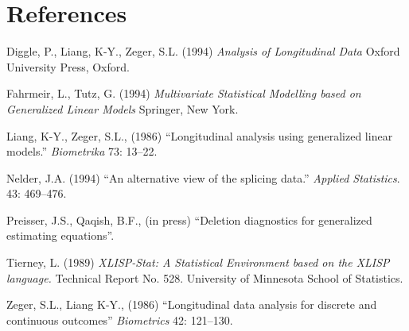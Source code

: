 \documentclass[10pt]{article}
\begin{document}
\section{References}

Diggle, P., Liang, K-Y., Zeger, S.L. (1994) \emph{Analysis of Longitudinal Data} Oxford University Press, Oxford.

Fahrmeir, L.,  Tutz, G. (1994) \emph{Multivariate Statistical Modelling based on Generalized Linear Models} Springer, New York.

Liang, K-Y., Zeger, S.L., (1986) ``Longitudinal analysis using generalized linear models.'' \emph{Biometrika} 73: 13--22.  

Nelder, J.A. (1994) ``An alternative view of the splicing data.'' \emph{Applied Statistics}. 43: 469--476.

Preisser, J.S., Qaqish, B.F., (in press) ``Deletion diagnostics for generalized estimating equations''. 

Tierney, L. (1989) \emph{XLISP-Stat: A Statistical Environment based on the XLISP language.} Technical Report No. 528. University of Minnesota School of Statistics.

Zeger, S.L., Liang K-Y., (1986) ``Longitudinal data analysis for discrete and continuous outcomes'' \emph{Biometrics} 42: 121--130.
\end{document}
